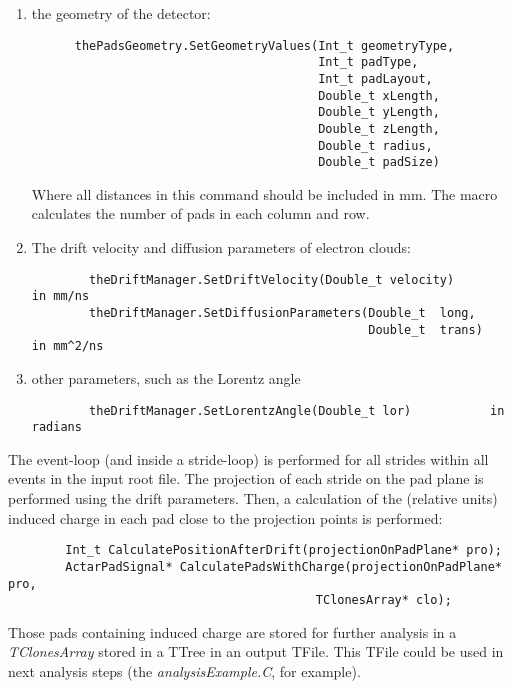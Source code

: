 \begin{enumerate}

\item the geometry of the detector:
\begin{verbatim}
      thePadsGeometry.SetGeometryValues(Int_t geometryType,
                                        Int_t padType,
                                        Int_t padLayout,
                                        Double_t xLength,
                                        Double_t yLength,
                                        Double_t zLength,
                                        Double_t radius,
                                        Double_t padSize)
\end{verbatim}
Where all distances in this command should be included in mm. The macro calculates the number of pads in each column and row.

\item The drift velocity and diffusion parameters of electron clouds:
\begin{verbatim}
        theDriftManager.SetDriftVelocity(Double_t velocity)       in mm/ns
        theDriftManager.SetDiffusionParameters(Double_t  long,
                                               Double_t  trans)   in mm^2/ns
\end{verbatim}

\item other parameters, such as the Lorentz angle
\begin{verbatim} 
        theDriftManager.SetLorentzAngle(Double_t lor)           in radians
\end{verbatim}
\end{enumerate}

The event-loop (and inside a stride-loop) is performed for all strides within all events in the input root file. The projection of each stride on the pad plane is performed using the drift parameters. Then, a calculation of the (relative units) induced charge in each pad close to the projection points is performed:
\begin{verbatim}
        Int_t CalculatePositionAfterDrift(projectionOnPadPlane* pro);
        ActarPadSignal* CalculatePadsWithCharge(projectionOnPadPlane* pro,
                                           TClonesArray* clo);
\end{verbatim}

Those pads containing induced charge are stored for further analysis in a \textit{TClonesArray} stored in a TTree in an output TFile. This TFile could be used in next analysis steps (the \textit{analysisExample.C}, for example).

